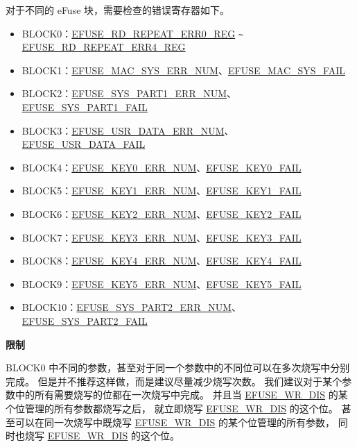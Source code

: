 \documentclass[main\_\_CN.tex]{subfiles}
\begin{document}
\begin{enumerate}
对于不同的 eFuse 块，需要检查的错误寄存器如下。
\begin{itemize}
    \item BLOCK0：\hyperref[regdesc:EFUSERDREPEATERR0REG]{EFUSE\_RD\_REPEAT\_ERR0\_REG} \verb+~+ \hyperref[regdesc:EFUSERDREPEATERR4REG]{EFUSE\_RD\_REPEAT\_ERR4\_REG}
    \item BLOCK1：\hyperref[fielddesc:EFUSEMACSYSERRNUM] {EFUSE\_MAC\_SYS\_ERR\_NUM}、\hyperref[fielddesc:EFUSEMACSYSFAIL] {EFUSE\_MAC\_SYS\_FAIL}
    \item BLOCK2：\hyperref[fielddesc:EFUSESYSPART1ERRNUM] {EFUSE\_SYS\_PART1\_ERR\_NUM}、\hyperref[fielddesc:EFUSESYSPART1FAIL] {EFUSE\_SYS\_PART1\_FAIL}
    \item BLOCK3：\hyperref[fielddesc:EFUSEUSRDATAERRNUM] {EFUSE\_USR\_DATA\_ERR\_NUM}、\hyperref[fielddesc:EFUSEUSRDATAFAIL] {EFUSE\_USR\_DATA\_FAIL}
    \item BLOCK4：\hyperref[fielddesc:EFUSEKEY0ERRNUM] {EFUSE\_KEY0\_ERR\_NUM}、\hyperref[fielddesc:EFUSEKEY0FAIL] {EFUSE\_KEY0\_FAIL}
    \item BLOCK5：\hyperref[fielddesc:EFUSEKEY1ERRNUM] {EFUSE\_KEY1\_ERR\_NUM}、\hyperref[fielddesc:EFUSEKEY1FAIL] {EFUSE\_KEY1\_FAIL}
    \item BLOCK6：\hyperref[fielddesc:EFUSEKEY2ERRNUM] {EFUSE\_KEY2\_ERR\_NUM}、\hyperref[fielddesc:EFUSEKEY2FAIL] {EFUSE\_KEY2\_FAIL}
    \item BLOCK7：\hyperref[fielddesc:EFUSEKEY3ERRNUM] {EFUSE\_KEY3\_ERR\_NUM}、\hyperref[fielddesc:EFUSEKEY3FAIL] {EFUSE\_KEY3\_FAIL}
    \item BLOCK8：\hyperref[fielddesc:EFUSEKEY4ERRNUM] {EFUSE\_KEY4\_ERR\_NUM}、\hyperref[fielddesc:EFUSEKEY4FAIL] {EFUSE\_KEY4\_FAIL}
    \item BLOCK9：\hyperref[fielddesc:EFUSEKEY5ERRNUM] {EFUSE\_KEY5\_ERR\_NUM}、\hyperref[fielddesc:EFUSEKEY5FAIL] {EFUSE\_KEY5\_FAIL}
    \item BLOCK10：\hyperref[fielddesc:EFUSESYSPART2ERRNUM] {EFUSE\_SYS\_PART2\_ERR\_NUM}、\hyperref[fielddesc:EFUSESYSPART2FAIL] {EFUSE\_SYS\_PART2\_FAIL}
\end{itemize}
\end{enumerate}


{\bfseries 限制}

BLOCK0 中不同的参数，甚至对于同一个参数中的不同位可以在多次烧写中分别完成。
但是并不推荐这样做，而是建议尽量减少烧写次数。
我们建议对于某个参数中的所有需要烧写的位都在一次烧写中完成。
并且当 \hyperref[fielddesc:EFUSEWRDIS]{EFUSE\_WR\_DIS} 的某个位管理的所有参数都烧写之后，
就立即烧写 \hyperref[fielddesc:EFUSEWRDIS]{EFUSE\_WR\_DIS} 的这个位。
甚至可以在同一次烧写中既烧写 \hyperref[fielddesc:EFUSEWRDIS]{EFUSE\_WR\_DIS} 的某个位管理的所有参数，
同时也烧写 \hyperref[fielddesc:EFUSEWRDIS]{EFUSE\_WR\_DIS} 的这个位。
\end{document}
